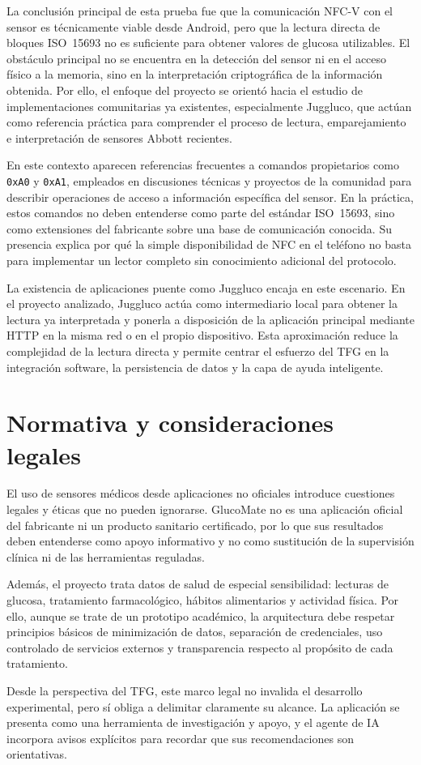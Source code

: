La conclusión principal de esta prueba fue que la comunicación NFC-V con el sensor es
técnicamente viable desde Android, pero que la lectura directa de bloques ISO~15693 no es
suficiente para obtener valores de glucosa utilizables. El obstáculo principal no se
encuentra en la detección del sensor ni en el acceso físico a la memoria, sino en la
interpretación criptográfica de la información obtenida. Por ello, el enfoque del
proyecto se orientó hacia el estudio de implementaciones comunitarias ya existentes,
especialmente Juggluco, que actúan como referencia práctica para comprender el proceso de
lectura, emparejamiento e interpretación de sensores Abbott recientes.

En este contexto aparecen referencias frecuentes a comandos propietarios como
\texttt{0xA0} y \texttt{0xA1}, empleados en discusiones técnicas y proyectos de la
comunidad para describir operaciones de acceso a información específica del sensor. En la
práctica, estos comandos no deben entenderse como parte del estándar ISO~15693, sino como
extensiones del fabricante sobre una base de comunicación conocida. Su presencia explica
por qué la simple disponibilidad de NFC en el teléfono no basta para implementar un lector
completo sin conocimiento adicional del protocolo.

La existencia de aplicaciones puente como Juggluco encaja en este escenario. En el
proyecto analizado, Juggluco actúa como intermediario local para obtener la lectura ya
interpretada y ponerla a disposición de la aplicación principal mediante HTTP en la misma
red o en el propio dispositivo. Esta aproximación reduce la complejidad de la lectura
directa y permite centrar el esfuerzo del TFG en la integración software, la persistencia
de datos y la capa de ayuda inteligente.

\section{Normativa y consideraciones legales}

El uso de sensores médicos desde aplicaciones no oficiales introduce cuestiones legales y
éticas que no pueden ignorarse. GlucoMate no es una aplicación oficial del fabricante ni
un producto sanitario certificado, por lo que sus resultados deben entenderse como apoyo
informativo y no como sustitución de la supervisión clínica ni de las herramientas
reguladas.

Además, el proyecto trata datos de salud de especial sensibilidad: lecturas de glucosa,
tratamiento farmacológico, hábitos alimentarios y actividad física. Por ello, aunque se
trate de un prototipo académico, la arquitectura debe respetar principios básicos de
minimización de datos, separación de credenciales, uso controlado de servicios externos y
transparencia respecto al propósito de cada tratamiento.

Desde la perspectiva del TFG, este marco legal no invalida el desarrollo experimental,
pero sí obliga a delimitar claramente su alcance. La aplicación se presenta como una
herramienta de investigación y apoyo, y el agente de IA incorpora avisos explícitos para
recordar que sus recomendaciones son orientativas.